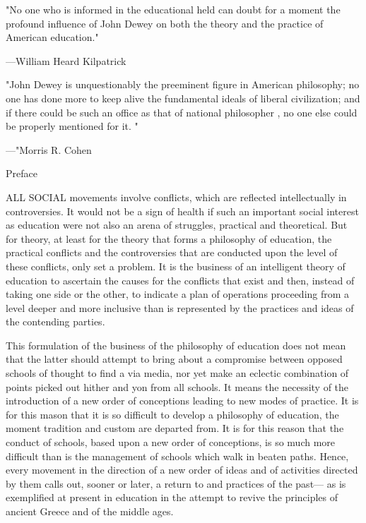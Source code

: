"No one who is informed in the educational held can doubt for a moment the profound 
influence of John Dewey on both the theory and the practice of American education." 


—William Heard Kilpatrick 


"John Dewey is unquestionably the preeminent figure in American philosophy; no one 
has done more to keep alive the fundamental ideals of liberal civilization; and if there 
could be such an office as that of national philosopher , no one else could be properly 
mentioned for it. " 


—"Morris R. Cohen 


Preface 

ALL SOCIAL movements involve conflicts, which are reflected intellectually in 
controversies. It would not be a sign of health if such an important social interest as 
education were not also an arena of struggles, practical and theoretical. But for theory, at 
least for the theory that forms a philosophy of education, the practical conflicts and the 
controversies that are conducted upon the level of these conflicts, only set a problem. It is 
the business of an intelligent theory of education to ascertain the causes for the conflicts 
that exist and then, instead of taking one side or the other, to indicate a plan of operations 
proceeding from a level deeper and more inclusive than is represented by the practices 
and ideas of the contending parties. 

This formulation of the business of the philosophy of education does not mean that the 
latter should attempt to bring about a compromise between opposed schools of thought to 
find a via media, nor yet make an eclectic combination of points picked out hither and 
yon from all schools. It means the necessity of the introduction of a new order of 
conceptions leading to new modes of practice. It is for this mason that it is so difficult to 
develop a philosophy of education, the moment tradition and custom are departed from. It 
is for this reason that the conduct of schools, based upon a new order of conceptions, is 
so much more difficult than is the management of schools which walk in beaten paths. 
Hence, every movement in the direction of a new order of ideas and of activities directed 
by them calls out, sooner or later, a return to and practices of the past— as is exemplified 
at present in education in the attempt to revive the principles of ancient Greece and of the 
middle ages. 


